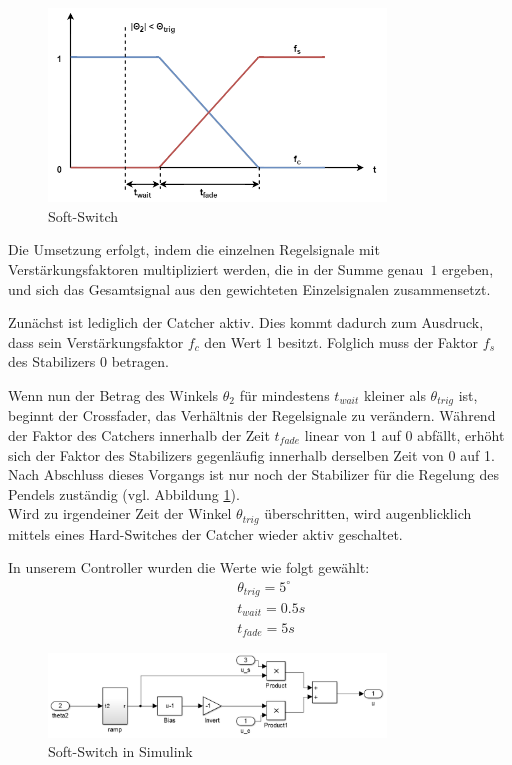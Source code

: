 \begin{figure}[htbp]
	\centering	
	\includegraphics[width=0.8\textwidth]{Grafiken/SoftSwitch.png}
	\caption{Soft-Switch}
	\label{fig.Soft-Switch}
\end{figure}

Die Umsetzung erfolgt, indem die einzelnen Regelsignale mit Verstärkungs\-fak\-to\-ren multipliziert werden, die in der Summe genau~$1$ ergeben, und sich das Gesamtsignal aus den gewichteten Einzelsignalen zusammensetzt.

Zunächst ist lediglich der Catcher aktiv. Dies kommt dadurch zum Ausdruck, dass sein Verstärkungsfaktor $f_c$ den Wert 1 besitzt. Folglich muss der Faktor $f_s$ des Stabilizers 0 betragen.

Wenn nun der Betrag des Winkels $\theta_2$ für mindestens $t_{wait}$ kleiner als $\theta_{trig}$ ist, beginnt der Crossfader, das Verhältnis der Regelsignale zu verändern.
Während der Faktor des Catchers innerhalb der Zeit $t_{fade}$ linear von 1 auf 0 abfällt, erhöht sich der Faktor des Stabilizers gegenläufig innerhalb derselben Zeit von 0 auf 1.
Nach Abschluss dieses Vorgangs ist nur noch der Stabilizer für die Regelung des Pendels zuständig (vgl. Abbildung \ref{fig.Soft-Switch}). \\

Wird zu irgendeiner Zeit der Winkel $\theta_{trig}$ überschritten, wird augenblicklich mittels eines Hard-Switches der Catcher wieder aktiv geschaltet.

In unserem Controller wurden die Werte wie folgt gewählt:
\begin{eqnarray*}
&& \theta_{trig} = 5^{\circ} \\
&& t_{wait} = 0.5 s \\
&& t_{fade} = 5 s
\end{eqnarray*}

\begin{figure}[htbp]
	\centering	
	\includegraphics[width=0.8\textwidth]{Grafiken/simulink_softswitch.png}
	\caption{Soft-Switch in Simulink}
	\label{fig.Simu_Soft-Switch}
\end{figure}

